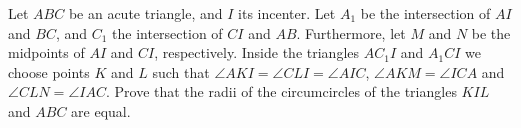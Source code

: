 Let $ABC$ be an acute triangle, and $I$ its incenter.
Let $A_1$ be the intersection of $AI$ and $BC$, and $C_1$ the intersection of $CI$ and $AB$.
Furthermore, let $M$ and $N$ be the midpoints of $AI$ and $CI$, respectively.
Inside the triangles $AC_1I$ and $A_1CI$ we choose points $K$ and $L$
such that $\angle AKI = \angle CLI = \angle AIC$, $\angle AKM = \angle ICA$ and $\angle CLN = \angle IAC$.
Prove that the radii of the circumcircles of the triangles $KIL$ and $ABC$ are equal.
